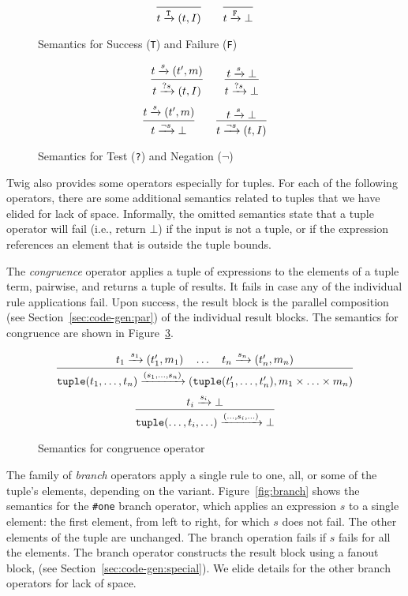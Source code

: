 \begin{figure}[ht]
\[
\infer
  {t \arr{\mathtt{T}} (t,I)}
  {}
\qquad
\infer
  {t \arr{\mathtt{F}} \bot}
  {}
\]
\caption{Semantics for Success (\texttt{T}) and Failure (\texttt{F})}
\label{fig:basic1}
\end{figure}

\begin{figure}[ht]
\[
\infer
  {t \arr{?s} (t,I)}
  {t \arr{s} (t',m)}
\qquad 
\infer
  {t \arr{?s} \bot}
  {t \arr{s} \bot}
\]
\[
\infer
  {t \arr{\lnot s} \bot}
  {t \arr{s} (t',m)}
\qquad 
\infer
  {t \arr{\lnot s} (t,I)}
  {t \arr{s} \bot}
\]
\caption{Semantics for Test (\texttt{?}) and Negation ($\lnot$)}
\label{fig:basic2}
\end{figure}

Twig also provides some operators especially for tuples. For each
of the following operators, there are some additional semantics
related to tuples that we have elided for lack of space.
Informally, the omitted semantics state that a tuple operator will
fail (i.e., return $\bot$) if the input is not a tuple, or if the
expression references an element that is outside the tuple bounds.


The \emph{congruence} operator applies a tuple of expressions to
the elements of a tuple term, pairwise, and returns a tuple of
results. It fails in case any of the individual rule applications
fail. Upon success, the result block is the parallel composition
(see Section~\ref{sec:code-gen:par}) of the individual result
blocks. The semantics for congruence are shown in
Figure~\ref{fig:congruence}.

\begin{figure}[ht]
\[
\infer
  {\mathtt{tuple}(t_1,\ldots,t_n)\arr{(s_1,\ldots,s_n)} (\mathtt{tuple}(t_1',\ldots,t_n'),m_1 \times \ldots \times m_n)}
  {t_1 \arr{s_1} (t_1',m_1) \quad \ldots \quad t_n \arr{s_n} (t_n',m_n)}
\]
\[
\infer
  {\mathtt{tuple}(\ldots,t_i,\ldots)\arr{(\ldots,s_i,\ldots)}\bot}
  {t_i \arr{s_i} \bot}
\]
\caption{Semantics for congruence operator}
\label{fig:congruence}
\end{figure}

The family of \emph{branch} operators apply a single rule to one,
all, or some of the tuple's elements, depending on the variant.
Figure~\ref{fig:branch} shows the semantics for the \texttt{\#one}
branch operator, which applies an expression $s$ to a single
element: the first element, from left to right, for which $s$ does
not fail. The other elements of the tuple are unchanged. The
branch operation fails if $s$ fails for all the elements. The
branch operator constructs the result block using a fanout block,
(see Section~\ref{sec:code-gen:special}). We elide details for the
other branch operators for lack of space.

